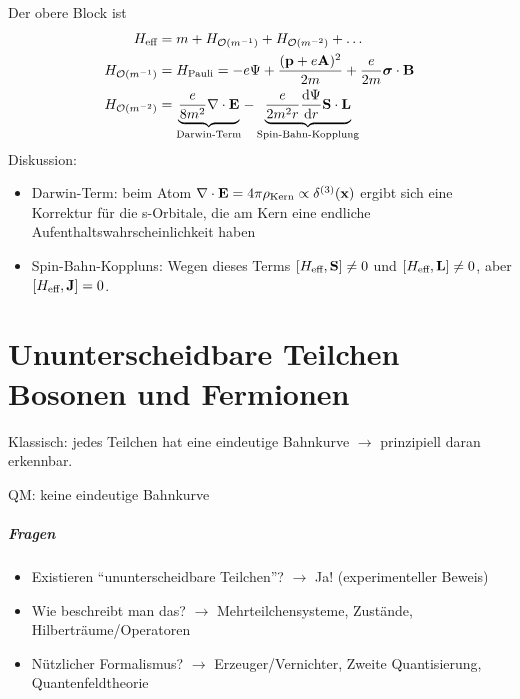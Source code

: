 \documentclass[11pt,a4paper]{report}
\renewcommand{\vec}{\boldsymbol}
\begin{document}
Der obere Block ist 
\begin{align*}
    H_{\text{eff}} &= m + H_{\mathcal{O}(m^{-1})} + H_{\mathcal{O}(m^{-2})} + \ldots \\
    H_{\mathcal{O}(m^{-1})} &= H_{\text{Pauli}} = -e \Psi + \frac{(\vf{p} + e \vf{A})^2}{2 m} + \frac{e}{2m}\vec{\sigma}\cdot \vf{B} \\
    H_{\mathcal{O}(m^{-2})} &= \underbrace{\frac{e}{8m^2}\nabla\cdot \vf{E}}_{\text{Darwin-Term}} - \underbrace{\frac{e}{2m^2 r} \frac{\mathrm{d}\Psi}{\mathrm{d}r} \vf{S}\cdot \vf{L}}_{\text{Spin-Bahn-Kopplung}}
\end{align*}
Diskussion:
\begin{itemize}
    \item Darwin-Term: beim Atom $\nabla\cdot\mathbf{E} = 4\pi \rho_{\text{Kern}} \propto \delta^{(3)}(\mathbf{x})$ ergibt sich eine Korrektur für die s-Orbitale, die am Kern eine endliche Aufenthaltswahrscheinlichkeit haben
    \item Spin-Bahn-Koppluns: Wegen dieses Terms $[H_{\text{eff}}, \mathbf{S}] \neq 0$ und $[H_{\text{eff}}, \mathbf{L}] \neq 0$, aber $[H_{\text{eff}}, \mathbf{J}] = 0$.
\end{itemize}

\chapter[Ununterscheidbare Teilchen - Bosonen und Fermionen]{Ununterscheidbare Teilchen\\ \Large{Bosonen und Fermionen}}

Klassisch: jedes Teilchen hat eine eindeutige Bahnkurve $\rightarrow$ prinzipiell daran erkennbar.\par 

QM: keine eindeutige Bahnkurve

\paragraph{Fragen}
\begin{itemize}
\item Existieren ``ununterscheidbare Teilchen''? $\rightarrow$ Ja! (experimenteller Beweis)
\item Wie beschreibt man das? $\rightarrow$ Mehrteilchensysteme, Zustände, Hilberträume/Operatoren
\item Nützlicher Formalismus? $\rightarrow$ Erzeuger/Vernichter, Zweite Quantisierung, Quantenfeldtheorie
\end{itemize}
\end{document}

